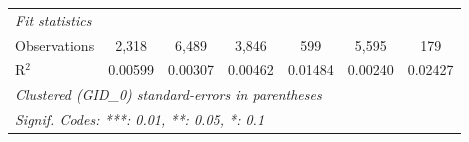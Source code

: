 \begin{tabular}{lcccccc}
   \midrule
   \emph{Fit statistics}\\
   Observations                       & 2,318       & 6,489          & 3,846          & 599            & 5,595          & 179\\  
   R$^2$                              & 0.00599     & 0.00307        & 0.00462        & 0.01484        & 0.00240        & 0.02427\\  
   \midrule \midrule
   \multicolumn{7}{l}{\emph{Clustered (GID\_0) standard-errors in parentheses}}\\
   \multicolumn{7}{l}{\emph{Signif. Codes: ***: 0.01, **: 0.05, *: 0.1}}\\
\end{tabular}
\par\endgroup



